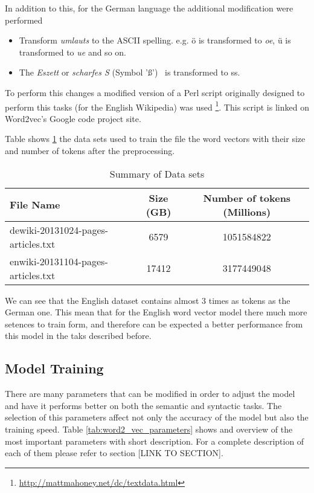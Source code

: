 In addition to this, for the German language the additional modification were
performed
\begin{itemize}
\item Transform \textit{umlauts} to the ASCII spelling.  e.g. \"{o} is
  transformed to \textit{oe},  \"{u} is transformed to \textit{ue}  and so
  on. 
\item The \textit{Eszett} or \textit{scharfes S} (Symbol '\ss') \  is transformed to ss.
\end{itemize}


To perform this changes a modified version of a Perl script originally
designed to perform this tasks (for the English Wikipedia) was used
\footnote{\url{http://mattmahoney.net/dc/textdata.html}}. This script is
linked on Word2vec's Google code project site.

Table shows \ref{tab:summ_dataset_germanword2vec} the data sets used
to train the file the word vectors with their size and number of tokens after
the preprocessing. 
  

 \begin{table}[h]

   \centering
   
   \caption{Summary of Data sets} 
   \label{tab:summ_dataset_germanword2vec}
   \small
   \begin{tabular}{ |l|c|c| }
   \hline           
    File Name &  Size (GB) & Number of tokens (Millions) \\  \hline           
    dewiki-20131024-pages-articles.txt & 6579 &   1051584822 \\ 
    enwiki-20131104-pages-articles.txt & 17412 &  3177449048  \\
    \hline

\end{tabular}
\end{table}



We can see that the English dataset contains almost 3 times as tokens as the
German one. This mean that for the English word vector model  there much more
setences to train form, and therefore can be expected a better performance
from this model in the taks described before. 
  
\subsection{Model Training}
\label{experiments:sub:Training}

There are many parameters that can be modified in order to adjust the model
and have it performs better on both the  semantic and syntactic tasks. The
selection of this parameters affect not only the accuracy of the model but
also the training speed.  Table \ref{tab:word2_vec_parameters} shows and
overview of the most important parameters with short description. For a
complete description of each of them please refer to section [LINK TO SECTION]. 


